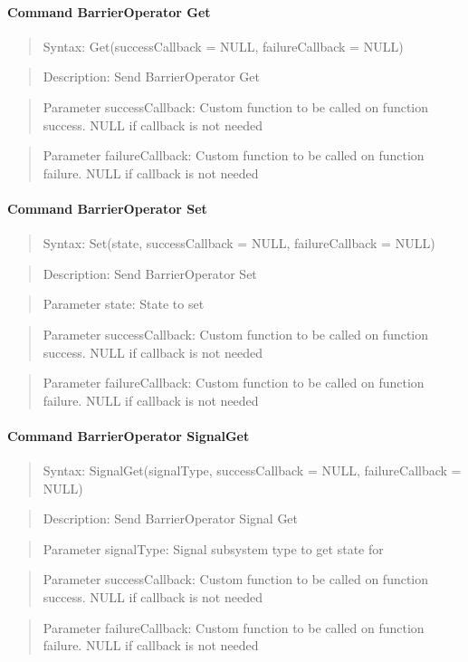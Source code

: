 \paragraph{Command BarrierOperator Get}
\begin{quote}Syntax: Get(successCallback = NULL, failureCallback = NULL)\end{quote}
\begin{quote}Description: Send BarrierOperator Get\end{quote}
\begin{quote}Parameter successCallback: Custom function to be called on function success. NULL if callback is not needed\end{quote}
\begin{quote}Parameter failureCallback: Custom function to be called on function failure. NULL if callback is not needed\end{quote}


\paragraph{Command BarrierOperator Set}
\begin{quote}Syntax: Set(state, successCallback = NULL, failureCallback = NULL)\end{quote}
\begin{quote}Description: Send BarrierOperator Set\end{quote}
\begin{quote}Parameter state: State to set\end{quote}
\begin{quote}Parameter successCallback: Custom function to be called on function success. NULL if callback is not needed\end{quote}
\begin{quote}Parameter failureCallback: Custom function to be called on function failure. NULL if callback is not needed\end{quote}


\paragraph{Command BarrierOperator SignalGet}
\begin{quote}Syntax: SignalGet(signalType, successCallback = NULL, failureCallback = NULL)\end{quote}
\begin{quote}Description: Send BarrierOperator Signal Get\end{quote}
\begin{quote}Parameter signalType: Signal subsystem type to get state for\end{quote}
\begin{quote}Parameter successCallback: Custom function to be called on function success. NULL if callback is not needed\end{quote}
\begin{quote}Parameter failureCallback: Custom function to be called on function failure. NULL if callback is not needed\end{quote}


